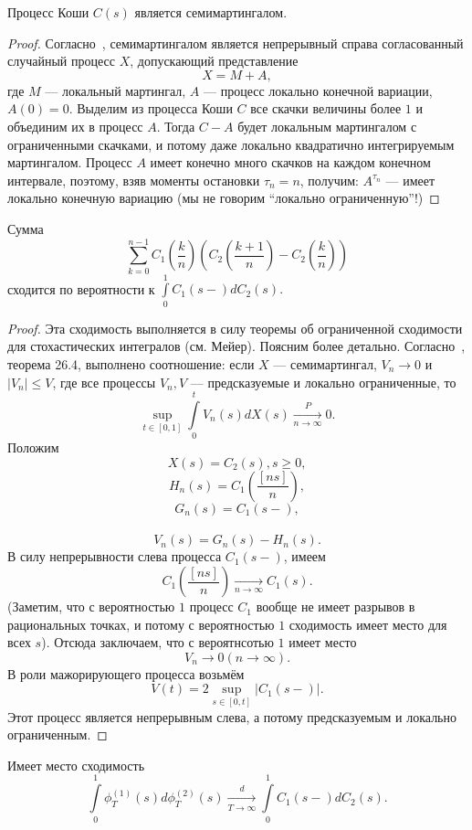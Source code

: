 \documentclass[12pt, a4paper, titlepage]{article}
\begin{document}
\begin{statement}
 Процесс Коши $C(s)$ является семимартингалом. 
\end{statement}
\begin{proof}
 Согласно~\cite{Kallenberg}, семимартингалом является непрерывный справа согласованный
случайный процесс $X$, допускающий представление 
$$X=M+A,$$
где $M$ --- локальный мартингал, $A$ --- процесс локально конечной вариации, $A(0)=0$. 
Выделим из процесса Коши $C$ все скачки величины более $1$ и объединим их в процесс $A$. 
Тогда $C-A$ будет локальным мартингалом с ограниченными скачками, и потому даже локально
квадратично интегрируемым мартингалом. 
 Процесс $A$ имеет конечно много скачков на каждом конечном интервале, поэтому, взяв
 моменты остановки $\tau_n=n$, получим: $A^{\tau_n}$ --- имеет локально конечную вариацию
(мы не говорим ``локально ограниченную''!)
\end{proof}

\begin{statement}\label{integralDominatedConvergenceStatement}
 Сумма
$$\sum\limits_{k=0}^{n-1}C_1\left(\frac{k}{n}\right)\left(C_2\left(\frac{k+1}{n}\right)-
C_2\left(\frac{k}{n}\right)\right)$$
сходится по вероятности к $\int\limits_0^1 C_1(s-)dC_2(s).$
\end{statement}
\begin{proof}
 Эта сходимость выполняется в силу теоремы об ограниченной сходимости для стохастических
 интегралов (см. Мейер).
Поясним более детально. Согласно~\cite{Kallenberg}, теорема 26.4, выполнено
соотношение:
если $X$ --- семимартингал,
$V_n\to 0$ и $|V_n|\le V$, где все процессы $V_n, V$ --- предсказуемые и локально
ограниченные, то 
$$\sup\limits_{t \in [0,1]}\int\limits_0^t V_n(s)dX(s)\xrightarrow[n\to\infty]{P}0.$$
Положим
$$X(s)=C_2(s),s \ge 0,$$
$$H_n(s)=C_1\left(\frac{[ns]}{n}\right),$$
$$G_n(s)=C_1(s-),$$\
$$V_n(s)=G_n(s)-H_n(s).$$
В силу непрерывности слева процесса $C_1(s-)$, имеем
$$C_1\left(\frac{[ns]}{n}\right)\xrightarrow[n\to\infty]{}C_1(s).$$
(Заметим, что с вероятностью $1$ процесс $C_1$ вообще не имеет разрывов в рациональных
точках, и потому с вероятностью $1$ сходимость имеет место для всех $s$).
Отсюда заключаем, что с вероятнсотью $1$ имеет место 
$$V_n\to 0 (n \to \infty).$$
В роли мажорирующего процесса возьмём
$$V(t)=2\sup\limits_{s\in [0,t]}|C_1(s-)|.$$
Этот процесс является непрерывным слева, а потому предсказуемым и локально ограниченным. 
\end{proof}

\begin{statement}
 Имеет место сходимость
$$\int\limits_0^1 \phi^{(1)}_T(s)d\phi^{(2)}_T(s)
\xrightarrow[T\to\infty]{d} 
\int\limits_0^1 C_1(s-)dC_2(s).$$
\end{statement}
\end{document}
